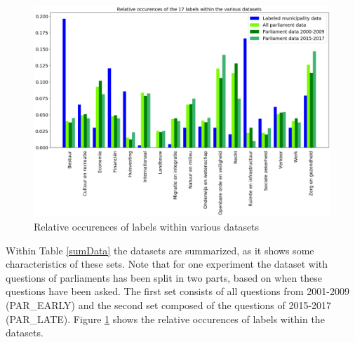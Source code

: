 \begin{figure}[H]
	\begin{center}
		\includegraphics[width=\linewidth]{"Labels in dataset"}
		\caption{Relative occurences of labels within various datasets}
		\label{fig:distributiontopics}
	\end{center}
\end{figure}

Within Table \ref{sumData} the datasets are summarized, as it shows some characteristics of these sets. Note that for one experiment the dataset with questions of parliaments has been split in two parts, based on when these questions have been asked. The first set consists of all questions from 2001-2009 (PAR\_EARLY) and the second set composed of the questions of 2015-2017 (PAR\_LATE). Figure \ref{fig:distributiontopics} shows the relative occurences of labels within the datasets.

